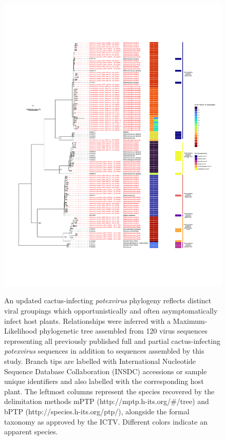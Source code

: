 \documentclass[fleqn,10pt,lineno]{wlpeerj}
\begin{document}

\begin{figure}[ht]
\centering
\caption{
An updated cactus-infecting \textit{potexvirus} phylogeny reflects distinct viral groupings which opportunistically and often asymptomatically infect host plants. Relationships were inferred with a Maximum-Likelihood phylogenetic tree assembled from 120 virus sequences representing all previously published full and partial cactus-infecting \textit{potexvirus} sequences in addition to sequences assembled by this study. Branch tips are labelled with International Nucleotide Sequence Database Collaboration (INSDC) accessions or sample unique identifiers and also labelled with the corresponding host plant.
The leftmost columns represent the species recovered by the delimitation methods mPTP (http://mptp.h-its.org/\#/tree) and bPTP (http://species.h-its.org/ptp/), alongside the formal taxonomy as approved by the ICTV.  
Different colors indicate an apparent species.
}
\includegraphics[width=1.0\textwidth]{figures/tree_delim_info.pdf}
\label{fig:tissuetype}
\end{figure}
\clearpage
\end{document}
